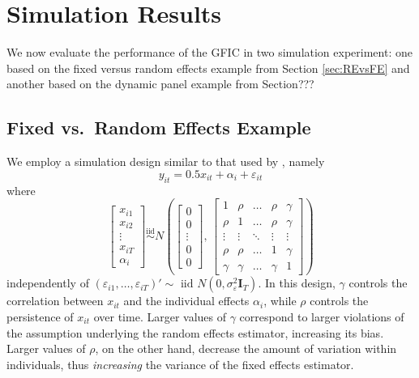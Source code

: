 \section{Simulation Results}
\label{sec:simulation}
We now evaluate the performance of the GFIC in two simulation experiment: one based on the fixed versus random effects example from Section \ref{sec:REvsFE} and another based on the dynamic panel example from Section??? 

\subsection{Fixed vs.\ Random Effects Example}
We employ a simulation design similar to that used by \cite{GuggenbergerRE}, namely
\begin{equation*}
  y_{it} = 0.5 x_{it} + \alpha_i + \varepsilon_{it}
\end{equation*}
where
\[
  \begin{bmatrix}
x_{i1}\\
x_{i2}\\
\vdots\\
x_{iT}\\
\alpha_i
\end{bmatrix}  \overset{\mbox{iid}}{\sim} N \left (
\begin{bmatrix}
0\\
0\\
\vdots\\
0\\
0
\end{bmatrix} , \, 
\begin{bmatrix}
1 & \rho & \ldots & \rho & \gamma\\
\rho & 1 & \ldots & \rho & \gamma\\
\vdots & \vdots&  \ddots & \vdots &\vdots\\
\rho & \rho & \ldots & 1 & \gamma\\
\gamma& \gamma &\ldots& \gamma & 1 
\end{bmatrix}
\right)
\]
independently of $\left( \varepsilon_{i1}, \dots, \varepsilon_{iT} \right)' \sim \mbox{ iid } N(0, \sigma_{\varepsilon}^2 \mathbf{I}_T)$.
In this design, $\gamma$ controls the correlation between $x_{it}$ and the individual effects $\alpha_i$, while $\rho$ controls the persistence of $x_{it}$ over time.
Larger values of $\gamma$ correspond to larger violations of the assumption underlying the random effects estimator, increasing its bias.
Larger values of $\rho$, on the other hand, decrease the amount of variation within individuals, thus \emph{increasing} the variance of the fixed effects estimator. 
